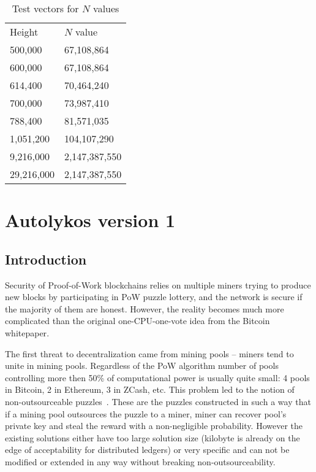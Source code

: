 \documentclass[]{article}
\begin{document}
    \begin{table}[h]
    \begin{tabular}{| l | l |}
    \hline
    Height & $N$ value  \\
    500,000 & 67,108,864 \\
    600,000 & 67,108,864 \\
    614,400 & 70,464,240 \\
    700,000 & 73,987,410 \\
    788,400 & 81,571,035 \\
    1,051,200 & 104,107,290 \\
    9,216,000 & 2,147,387,550 \\
    29,216,000 & 2,147,387,550 \\
    \hline
    \end{tabular}
    \label{ntbl}
    \caption{Test vectors for $N$ values}
    \end{table}



    \section{Autolykos version 1}
    \label{av1}

    \subsection{Introduction}

    Security of Proof-of-Work blockchains relies
    on multiple miners trying to produce new blocks by
    participating in PoW puzzle lottery, and the network is secure if the
    majority of them are honest. However, the reality becomes much more complicated
    than the original one-CPU-one-vote idea from the Bitcoin whitepaper\cite{nakamoto2008bitcoin}.

    The first threat to decentralization came from mining pools -- miners tend
    to unite in mining pools.
    Regardless of the PoW algorithm number of pools controlling more then 50\% of
    computational power is usually quite small: 4 pools in Bitcoin, 2 in Ethereum, 3 in ZCash, etc.
    This problem led to the notion of non-outsourceable puzzles~\cite{miller2015nonoutsourceable,daian2017piecework}.
    These are the puzzles constructed in such a way that if a mining pool outsources the puzzle
    to a miner, miner can recover pool's private key and steal the reward with a non-negligible probability.
    However the existing solutions either have too large solution size (kilobyte is already
    on the edge of acceptability for distributed ledgers) or very specific and
    can not be modified or extended in any way without breaking non-outsourceability.
\end{document}
